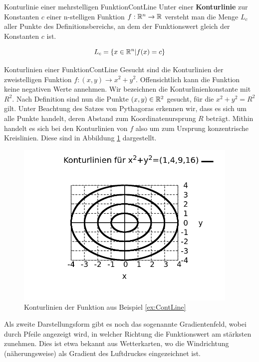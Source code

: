 \begin{definition}{Konturlinie einer mehrstelligen Funktion}{ContLine}
    Unter einer \textbf{Konturlinie} zur Konstanten $c$ einer n-stelligen Funktion $f: \mathbb{R}^n\to\mathbb{R}$ versteht man die Menge $L_c$ aller Punkte des Definitionsbereichs, an dem der Funktionswert gleich der Konstanten $c$ ist.

    $$
       L_c = \lbrace x \in \mathbb{R}^n | f(x) = c \rbrace
    $$
\end{definition}

\begin{example}{Konturlinien einer Funktion}{ContLine}
    Gesucht sind die Konturlinien der zweistelligen Funktion $f: (x,y) \to x^2+y^2$. Offensichtlich kann die Funktion keine negativen Werte annehmen. Wir bezeichnen die Konturlinienkonstante mit $R^2$. Nach Definition sind nun die Punkte $(x,y)\in\mathbb{R}^2$ gesucht, für die $x^2+y^2=R^2$ gilt. Unter Beachtung des Satzes von Pythagoras erkennen wir, dass es sich um alle Punkte handelt, deren Abstand zum Koordinatenursprung $R$ beträgt. Mithin handelt es sich bei den Konturlinien von $f$ also um zum Ursprung konzentrische Kreislinien. Diese sind in Abbildung \ref{fig:ExContLine} dargestellt.
\end{example}

\begin{figure}[h]
    \caption{Konturlinien der Funktion aus Beispiel \ref{ex:ContLine}}
    \label{fig:ExContLine}
    \centering
    \includegraphics[width=0.95\textwidth]{./gnuplot/example-contour-plot.png}
\end{figure}

Als zweite Darstellungsform gibt es noch das sogenannte Gradientenfeld, wobei durch Pfeile angezeigt wird, in welcher Richtung die Funktionswert am stärksten zunehmen. Dies ist etwa bekannt aus Wetterkarten, wo die Windrichtung (näherungsweise) als Gradient des Luftdruckes eingezeichnet ist.

